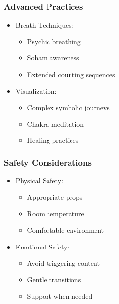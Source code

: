 \begin{frame}[fragile]\frametitle{Advanced Practices}
    \begin{itemize}
        \item Breath Techniques:
            \begin{itemize}
                \item Psychic breathing
                \item Soham awareness
                \item Extended counting sequences
            \end{itemize}
        \item Visualization:
            \begin{itemize}
                \item Complex symbolic journeys
                \item Chakra meditation
                \item Healing practices
            \end{itemize}
    \end{itemize}
\end{frame}

\begin{frame}[fragile]\frametitle{Safety Considerations}
    \begin{itemize}
        \item Physical Safety:
            \begin{itemize}
                \item Appropriate props
                \item Room temperature
                \item Comfortable environment
            \end{itemize}
        \item Emotional Safety:
            \begin{itemize}
                \item Avoid triggering content
                \item Gentle transitions
                \item Support when needed
            \end{itemize}
    \end{itemize}
\end{frame}

